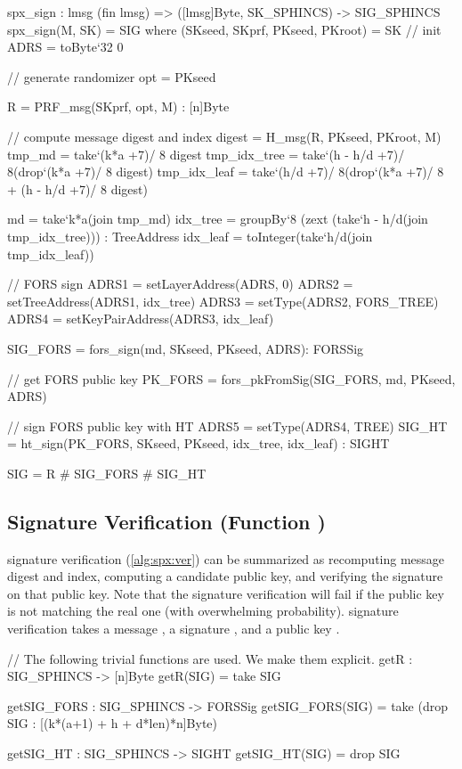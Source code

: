 \begin{code}
  spx_sign : {lmsg} (fin lmsg) => ([lmsg]Byte, SK_SPHINCS) -> SIG_SPHINCS
  spx_sign(M, SK) = SIG where
    (SKseed, SKprf, PKseed, PKroot) = SK
    // init
    ADRS = toByte`{32} 0

    // generate randomizer
    opt = PKseed
    
    R = PRF_msg(SKprf, opt, M) : [n]Byte

    // compute message digest and index
    digest = H_msg(R, PKseed, PKroot, M)
    tmp_md =
      take`{(k*a +7)/ 8} digest
    tmp_idx_tree =
      take`{(h - h/d +7)/ 8}(drop`{(k*a +7)/ 8} digest)
    tmp_idx_leaf =
      take`{(h/d +7)/ 8}(drop`{(k*a +7)/ 8 + (h - h/d +7)/ 8} digest)

    md = take`{k*a}(join tmp_md)
    idx_tree =
      groupBy`{8} (zext (take`{h - h/d}(join tmp_idx_tree))) : TreeAddress
    idx_leaf = toInteger(take`{h/d}(join tmp_idx_leaf))

    // FORS sign
    ADRS1 = setLayerAddress(ADRS, 0)
    ADRS2 = setTreeAddress(ADRS1, idx_tree)
    ADRS3 = setType(ADRS2, FORS_TREE)
    ADRS4 = setKeyPairAddress(ADRS3, idx_leaf)

    SIG_FORS = fors_sign(md, SKseed, PKseed, ADRS): FORSSig

    // get FORS public key 
    PK_FORS = fors_pkFromSig(SIG_FORS, md, PKseed, ADRS)

    // sign FORS public key with HT
    ADRS5 = setType(ADRS4, TREE)
    SIG_HT = ht_sign(PK_FORS, SKseed, PKseed, idx_tree, idx_leaf) : SIGHT

    SIG = R # SIG_FORS # SIG_HT
\end{code}

\subsection{\spx Signature Verification (Function \spxverify)}

   \spx signature verification (\autoref{alg:spx:ver}) can be summarized as 
   recomputing message digest and index, computing a candidate \fors public key,
   and verifying the \hyper signature on that public key. Note that the \hyper
   signature verification will fail if the \fors public key is not matching the
   real one (with overwhelming probability). \spx signature verification takes 
   a message \msg, a signature \spxsig, and a \spx public key \PK.

\begin{code}
  // The following trivial functions are used. We make them explicit.
  getR : SIG_SPHINCS -> [n]Byte
  getR(SIG) = take SIG

  getSIG_FORS : SIG_SPHINCS -> FORSSig
  getSIG_FORS(SIG) = take (drop SIG : [(k*(a+1) + h + d*len)*n]Byte)

  getSIG_HT : SIG_SPHINCS -> SIGHT
  getSIG_HT(SIG) = drop SIG
\end{code}

